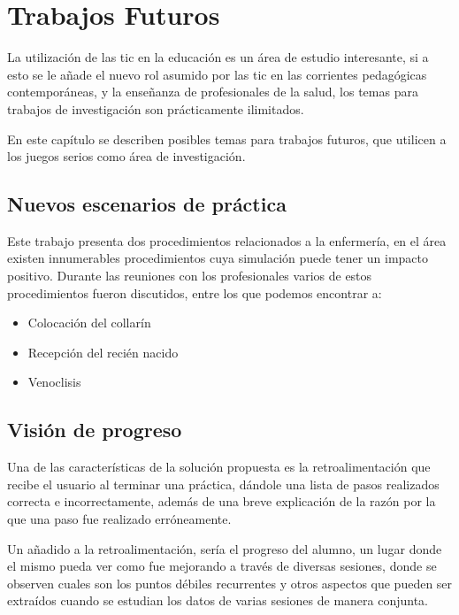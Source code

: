 \chapter{Trabajos Futuros}
\label{chap:futuro}

La utilización de las \Gls{tic} en la educación es un área de estudio
interesante, si a esto se le añade el nuevo rol asumido por las \Gls{tic} en las
corrientes pedagógicas contemporáneas, y la enseñanza de profesionales de la
salud, los temas para trabajos de investigación son prácticamente ilimitados. 

En este capítulo se describen posibles temas para trabajos futuros, que utilicen
a los juegos serios como área de investigación.

\section{Nuevos escenarios de práctica}

Este trabajo presenta dos procedimientos relacionados a la enfermería, en el
área existen innumerables procedimientos cuya simulación puede tener un impacto
positivo. Durante las reuniones con los profesionales varios de estos
procedimientos fueron discutidos, entre los que podemos encontrar a:

\begin{itemize}
    \item Colocación del collarín
    \item Recepción del recién nacido
    \item Venoclisis
\end{itemize}

\section{Visión de progreso}

Una de las características de la solución propuesta es la retroalimentación que
recibe el usuario al terminar una práctica, dándole una lista de pasos
realizados correcta e incorrectamente, además de una breve explicación de la
razón por la que una paso fue realizado erróneamente.

Un añadido a la retroalimentación, sería el progreso del alumno, un lugar donde
el mismo pueda ver como fue mejorando a través de diversas sesiones, donde se
observen cuales son los puntos débiles recurrentes y otros aspectos que pueden
ser extraídos cuando se estudian los datos de varias sesiones de manera
conjunta. 

